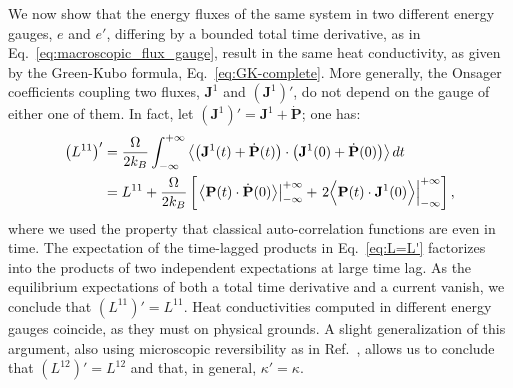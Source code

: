 We now show that the energy fluxes of the same system in two different energy gauges, $e$ and $e'$, differing by a bounded total time derivative, as in Eq.~\eqref{eq:macroscopic_flux_gauge}, result in the same heat conductivity, as given by the Green-Kubo formula, Eq.~\eqref{eq:GK-complete}. More generally, the Onsager coefficients coupling two fluxes, $\mathbf{J}^1$ and $\left(\mathbf{J}^1\right)'$, do not depend on the gauge of either one of them. In fact, let $\left(\mathbf{J}^1\right)' = \mathbf{J}^1 + \dot{\mathbf{P}}$; one has:
\begin{equation}
  \begin{aligned}
    \left (L^{11} \right)' &= \frac{\rOmega}{2 k_B }\int_{-\infty}^{+\infty} \left \langle \left (\mathbf{J}^1(t)+\dot{\mathbf{P}}(t) \right ) \cdot  \left (\mathbf{J}^1(0)+\dot{\mathbf{P}}(0)\right ) \right \rangle dt \\
    &= L^{11} + \frac{\rOmega}{2 k_B } \left[ \left .  \left \langle \mathbf{P}(t) \cdot \dot{\mathbf{P}}(0) \right \rangle \right |^{+\infty}_{-\infty} + \left .  2 \Bigl \langle \mathbf{P}(t) \cdot \mathbf{J}^1(0) \Bigr \rangle \right |^{+\infty}_{-\infty} \right] ,
  \end{aligned} \label{eq:L=L'}
\end{equation}
where we used the property that classical auto-correlation functions are even in time.
The expectation of the time-lagged products in Eq.~\eqref{eq:L=L'} factorizes into the products of two independent expectations at large time lag. As the equilibrium expectations of both a total time derivative and a current vanish, we conclude that $\left (L^{11}\right )'=L^{11}$. Heat conductivities computed in different energy gauges coincide, as they must on physical grounds. A slight generalization of this argument, also using microscopic reversibility as in Ref.~\cite{Onsager1931a,Onsager1931b}, allows us to conclude that $\left (L^{12} \right )'=L^{12}$ and that, in general, $\kappa'=\kappa$.

\bigskip
{}


